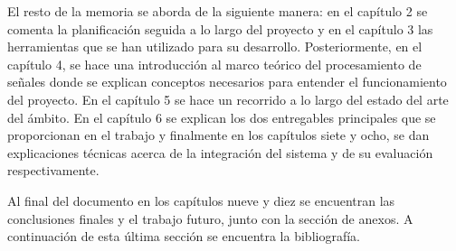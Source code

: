 El resto de la memoria se aborda de la siguiente manera: en el capítulo 2 se comenta la planificación seguida a lo largo del proyecto y en el capítulo 3 las herramientas que se han utilizado para su desarrollo. Posteriormente, en el capítulo 4, se hace una introducción al marco teórico del procesamiento de señales donde se explican conceptos necesarios para entender el funcionamiento del proyecto. En el capítulo 5 se hace un recorrido a lo largo del estado del arte del ámbito. En el capítulo 6 se explican los dos entregables principales que se proporcionan en el trabajo y finalmente en los capítulos siete y ocho, se dan explicaciones técnicas acerca de la
integración del sistema y de su evaluación respectivamente.

Al final del documento en los capítulos nueve y diez se encuentran las conclusiones finales y el trabajo futuro, junto con la sección de anexos. A continuación de esta última sección se encuentra la bibliografía.